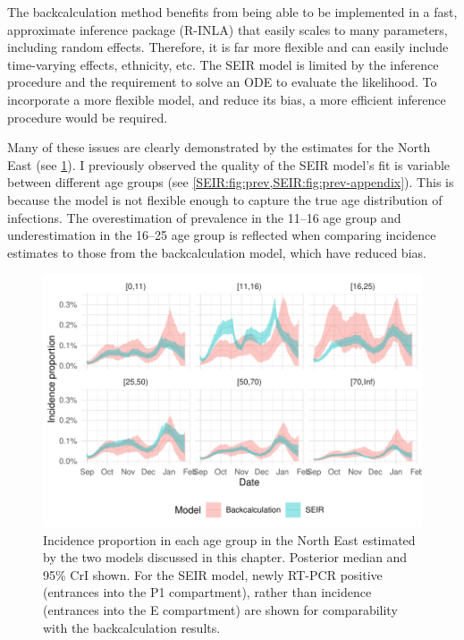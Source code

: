 \documentclass[thesis.tex]{subfiles}
\begin{document}
The backcalculation method benefits from being able to be implemented in a fast, approximate inference package (R-INLA) that easily scales to many parameters, including random effects.
Therefore, it is far more flexible and can easily include time-varying effects, ethnicity, etc.
The SEIR model is limited by the inference procedure and the requirement to solve an ODE to evaluate the likelihood.
To incorporate a more flexible model, and reduce its bias, a more efficient inference procedure would be required.

Many of these issues are clearly demonstrated by the estimates for the North East (see \cref{transmission:fig:compare-NE}).
I previously observed the quality of the SEIR model's fit is variable between different age groups (see \cref{SEIR:fig:prev,SEIR:fig:prev-appendix}).
This is because the model is not flexible enough to capture the true age distribution of infections.
The overestimation of prevalence in the 11--16 age group and underestimation in the 16--25 age group is reflected when comparing incidence estimates to those from the backcalculation model, which have reduced bias.
\begin{figure}
    \centering \includegraphics{transmission/compare-NE}
    \caption[Comparing each models estimate of North East incidence by age.]{%
        Incidence proportion in each age group in the North East estimated by the two models discussed in this chapter.
        Posterior median and 95\% CrI shown.
        For the SEIR model, newly RT-PCR positive (entrances into the P1 compartment), rather than incidence (entrances into the E compartment) are shown for comparability with the backcalculation results.
    }
    \label{transmission:fig:compare-NE}
\end{figure}
\end{document}
